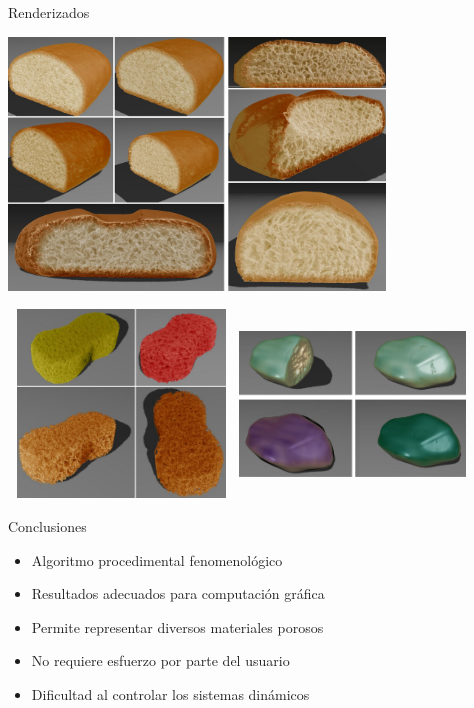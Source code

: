 \documentclass[spanish,unknownkeysallowed]{beamer}
\begin{document}
\begin{frame}{Renderizados}

\centerline{\includegraphics[width=10cm]{../figures/Fig12CAVW}}
\end{frame}

\begin{frame}{}

\includegraphics[width=6cm, height=5cm]{../figures/Fig13CAVW}
\includegraphics[width=6cm, height=5cm]{../figures/Fig14CAVW}

\end{frame}

\begin{frame}{Conclusiones}
\begin{block}{}
\begin{itemize}
\item Algoritmo procedimental fenomenológico
\item Resultados adecuados para computación gráfica
\item Permite representar diversos materiales porosos
\item No requiere esfuerzo por parte del usuario

\item Dificultad al controlar los sistemas dinámicos
\end{itemize}
\end{block}
\end{frame}
\end{document}
